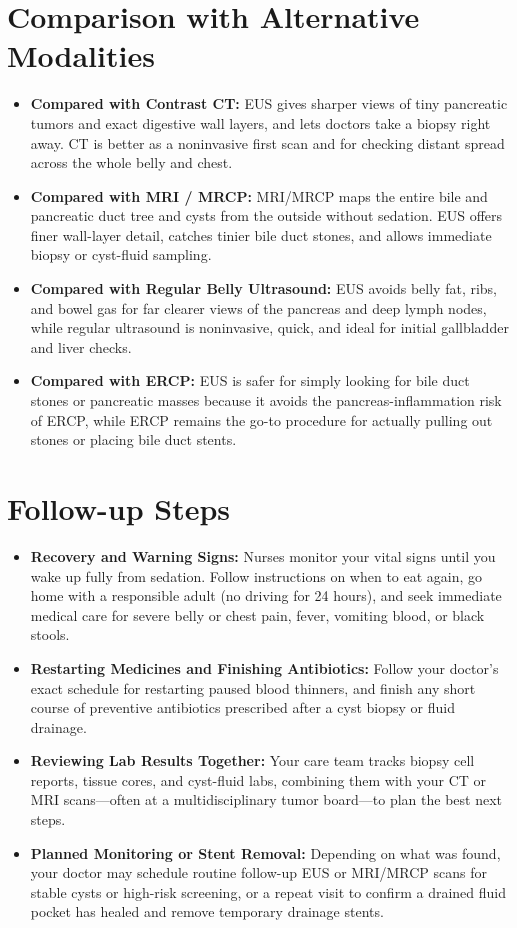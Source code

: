 \section{Comparison with Alternative Modalities}

\begin{itemize}
    \item \textbf{Compared with Contrast CT:} EUS gives sharper views of tiny pancreatic tumors and exact digestive wall layers, and lets doctors take a biopsy right away. CT is better as a noninvasive first scan and for checking distant spread across the whole belly and chest.
    \item \textbf{Compared with MRI / MRCP:} MRI/MRCP maps the entire bile and pancreatic duct tree and cysts from the outside without sedation. EUS offers finer wall-layer detail, catches tinier bile duct stones, and allows immediate biopsy or cyst-fluid sampling.
    \item \textbf{Compared with Regular Belly Ultrasound:} EUS avoids belly fat, ribs, and bowel gas for far clearer views of the pancreas and deep lymph nodes, while regular ultrasound is noninvasive, quick, and ideal for initial gallbladder and liver checks.
    \item \textbf{Compared with ERCP:} EUS is safer for simply looking for bile duct stones or pancreatic masses because it avoids the pancreas-inflammation risk of ERCP, while ERCP remains the go-to procedure for actually pulling out stones or placing bile duct stents.
\end{itemize}

\section{Follow-up Steps}

\begin{itemize}
    \item \textbf{Recovery and Warning Signs:} Nurses monitor your vital signs until you wake up fully from sedation. Follow instructions on when to eat again, go home with a responsible adult (no driving for 24 hours), and seek immediate medical care for severe belly or chest pain, fever, vomiting blood, or black stools.
    \item \textbf{Restarting Medicines and Finishing Antibiotics:} Follow your doctor's exact schedule for restarting paused blood thinners, and finish any short course of preventive antibiotics prescribed after a cyst biopsy or fluid drainage.
    \item \textbf{Reviewing Lab Results Together:} Your care team tracks biopsy cell reports, tissue cores, and cyst-fluid labs, combining them with your CT or MRI scans---often at a multidisciplinary tumor board---to plan the best next steps.
    \item \textbf{Planned Monitoring or Stent Removal:} Depending on what was found, your doctor may schedule routine follow-up EUS or MRI/MRCP scans for stable cysts or high-risk screening, or a repeat visit to confirm a drained fluid pocket has healed and remove temporary drainage stents.
\end{itemize}


